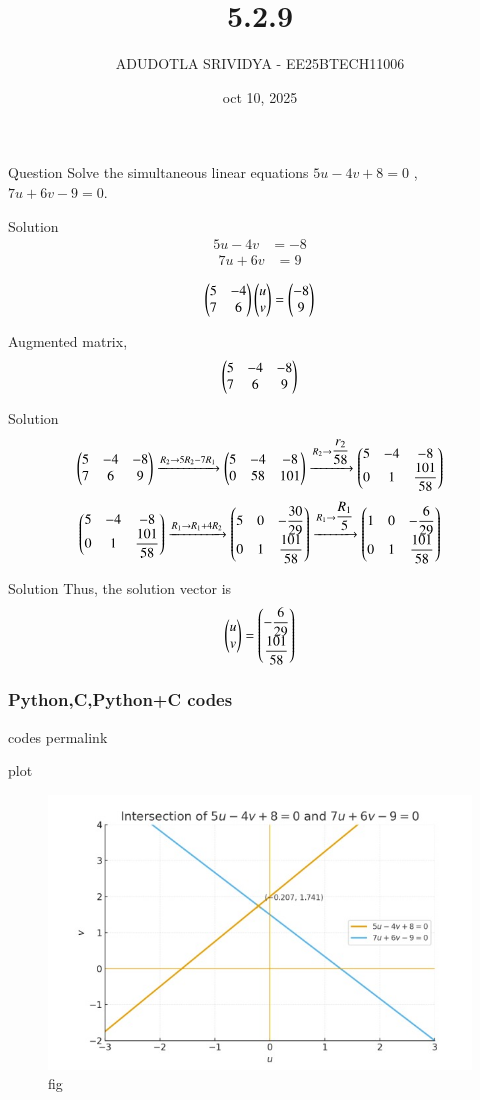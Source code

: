 \documentclass{beamer}
\title{5.2.9}
\date{oct 10, 2025}
\author{ADUDOTLA SRIVIDYA - EE25BTECH11006}
\begin{document}
\frame{\titlepage}
\begin{frame}{Question}
Solve the simultaneous linear equations
$5u-4v+8=0$ , $7u+6v-9=0$.
\end{frame}

\begin{frame}{Solution}
    \begin{align}
5u - 4v &= -8 
\end{align}
\begin{align}
7u + 6v &= 9
\end{align}

\begin{align}
\begin{pmatrix}5 & -4 \\ 7 & 6\end{pmatrix}\begin{pmatrix}u \\ v\end{pmatrix}=\begin{pmatrix}-8 \\ 9\end{pmatrix}
\end{align}

Augmented matrix,
\begin{align}
\begin{pmatrix}5 & -4 & -8 \\ 7 & 6 & 9\end{pmatrix} 
\end{align}
\end{frame}

\begin{frame}{Solution}
    \begin{align}
\begin{pmatrix}5 & -4 & -8 \\ 7 & 6 & 9\end{pmatrix}
\xrightarrow{R_2 \rightarrow 5R_2-7R_1}
\begin{pmatrix}5 & -4 & -8 \\ 0 & 58 & 101\end{pmatrix}
\xrightarrow{R_2 \rightarrow \dfrac{r_2}{58}}
\begin{pmatrix}5 & -4 & -8 \\ 0 & 1 & \dfrac{101}{58}\end{pmatrix}
\end{align}
\begin{align}
\begin{pmatrix}5 & -4 & -8 \\ 0 & 1 & \dfrac{101}{58}\end{pmatrix}
\xrightarrow{R_1 \rightarrow R_1+4R_2}
\begin{pmatrix}5 & 0 & -\dfrac{30}{29} \\ 0 & 1 & \dfrac{101}{58}\end{pmatrix}
\xrightarrow{R_1 \rightarrow \dfrac{R_1}{5}}
\begin{pmatrix}1 & 0 & -\dfrac{6}{29} \\ 0 & 1 & \dfrac{101}{58}\end{pmatrix}
\end{align}
\end{frame}

\begin{frame}{Solution}
    Thus, the solution vector is
\begin{align}
    \begin{pmatrix}u \\ v\end{pmatrix}=\begin{pmatrix}-\dfrac{6}{29} \\ \dfrac{101}{58}\end{pmatrix}
\end{align}
\end{frame}

\begin{frame}[fragile]
\frametitle{Python,C,Python+C codes}
codes permalink
\end{frame}

\begin{frame}{plot}
    \begin{figure}
    \centering
    \includegraphics[width=0.5\columnwidth]{figs/fig.jpeg}
    \caption{fig}
    \label{fig:}
\end{figure}
\end{frame}
\end{document}
